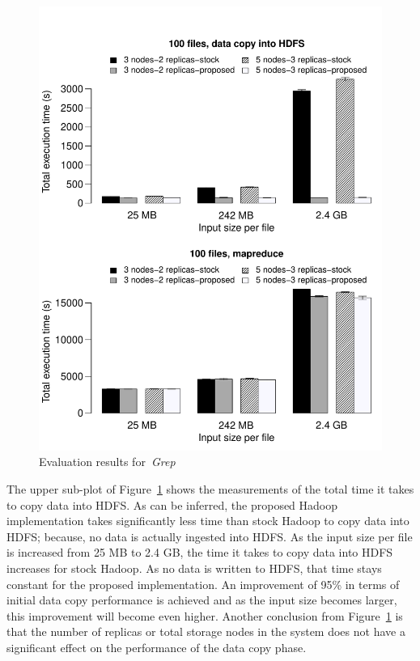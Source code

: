 \documentclass[preprint,12pt]{elsarticle}
\begin{document}
\begin{figure}[!htbp]
\centering
\includegraphics[width=\columnwidth, keepaspectratio]{result1.pdf}
\caption{Evaluation results for~\textit{Grep}}
\label{grepres}
\end{figure}

The upper sub-plot of Figure~\ref{grepres} shows the measurements of the total time it
takes to copy data into HDFS. As can be inferred, the proposed Hadoop implementation
takes significantly less time than stock Hadoop to copy data into HDFS; because, no
data is actually ingested into HDFS. As the input size per file is
increased from 25 MB to 2.4 GB, the time it takes to copy data into HDFS increases
for stock Hadoop. As no data is written to HDFS, that time stays constant
for the proposed implementation. An improvement of 95\% in terms of 
initial data copy performance is achieved and as the input size becomes larger, this improvement
will become even higher. Another conclusion from Figure~\ref{grepres} is that the
number of replicas or total storage nodes in the system does not have a significant
effect on the performance of the data copy phase.
\end{document}
